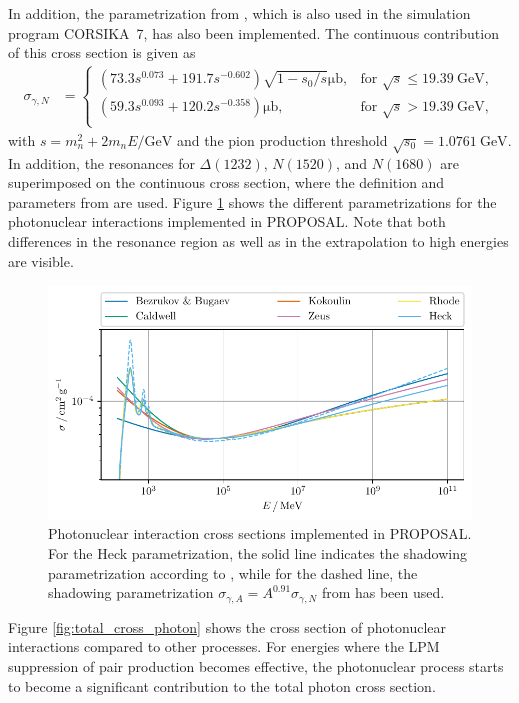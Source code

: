 In addition, the parametrization from \cite{Heck2012CORSIKA}, which is also used in the simulation program CORSIKA~7, has also been implemented.
The continuous contribution of this cross section is given as 
%
\begin{align}
	\label{eqn:photonuclear_C7}
	\sigma_{\gamma,N} &=
	\begin{cases}
		\left(73.3 s^{0.073} + 191.7 s^{-0.602} \right) \sqrt{1 - s_0 / s} \si{\micro\barn}, & \text{for } \sqrt{s} \leq \SI{19.39}{\giga\electronvolt}, \\
		\left( 59.3 s^{0.093} + 120.2 s^{-0.358} \right) \si{\micro\barn}, & \text{for } \sqrt{s} > \SI{19.39}{\giga\electronvolt}, \\
	\end{cases}
\end{align} 
%
with $s = m_n^2 + 2 m_n E / \si{\giga\electronvolt}$ and the pion production threshold $\sqrt{s_0} = \SI{1.0761}{\giga\electronvolt}$.
In addition, the resonances for $\Delta(1232)$, $N(1520)$, and $N(1680)$ are superimposed on the continuous cross section, where the definition and parameters from \cite{Muecke_2000} are used.
Figure \ref{fig:photoproduction_cross} shows the different parametrizations for the photonuclear interactions implemented in PROPOSAL.
Note that both differences in the resonance region as well as in the extrapolation to high energies are visible.
%
\begin{figure}
	\centering
    \includegraphics{plots/photoproduction_cross.pdf}
    \caption{Photonuclear interaction cross sections implemented in PROPOSAL. For the Heck parametrization, the solid line indicates the shadowing parametrization according to \cite{KOEHNE20132070}, while for the dashed line, the shadowing parametrization $\sigma_{\gamma,A} = A^{0.91} \sigma_{\gamma,N}$ from \cite{Heck2012CORSIKA} has been used.}
    \label{fig:photoproduction_cross}
\end{figure}
%
Figure \ref{fig:total_cross_photon} shows the cross section of photonuclear interactions compared to other processes.
For energies where the LPM suppression of pair production becomes effective, the photonuclear process starts to become a significant contribution to the total photon cross section.

